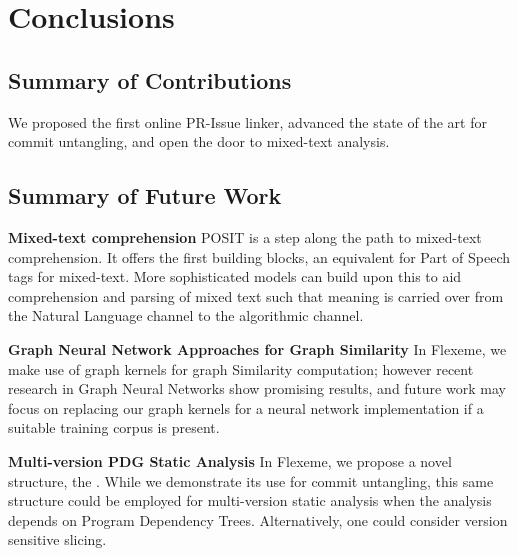 \chapter{Conclusions}
\label{chapter:conclusions}


\section{Summary of Contributions}


We proposed the first online PR-Issue linker, advanced the state of the art for commit untangling, and open the door to mixed-text analysis.

\section{Summary of Future Work}


\textbf{Mixed-text comprehension}
POSIT is a step along the path to mixed-text comprehension. It offers the first building blocks, an equivalent for Part of Speech tags for mixed-text. More sophisticated models can build upon this to aid comprehension and parsing of mixed text such that meaning is carried over from the Natural Language channel to the algorithmic channel.

\textbf{Graph Neural Network Approaches for Graph Similarity}
In Flexeme, we make use of graph kernels for graph Similarity computation; however recent research in Graph Neural Networks show promising results, and future work may focus on replacing our graph kernels for a neural network implementation if a suitable training corpus is present.

\textbf{Multi-version PDG Static Analysis}
In Flexeme, we propose a novel structure, the \deltaPDGN. While we demonstrate its use for commit untangling, this same structure could be employed for multi-version static analysis when the analysis depends on Program Dependency Trees. Alternatively, one could consider version sensitive slicing.